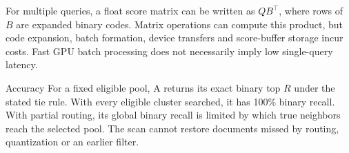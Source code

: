 For multiple queries, a float score matrix can be written as $QB^\top$, where rows of $B$ are
expanded binary codes. Matrix operations can compute this product, but code expansion, batch formation, device
transfers and score-buffer storage incur costs. Fast GPU batch processing does not necessarily imply low
single-query latency.

\begin{resultbox}{Accuracy}
For a fixed eligible pool, A returns its exact binary top $R$ under the stated tie rule.
With every eligible cluster searched, it has 100\% binary recall. With partial routing,
its global binary recall is limited by which true neighbors reach the selected pool.
The scan cannot restore documents missed by routing, quantization or an earlier filter.
\end{resultbox}
